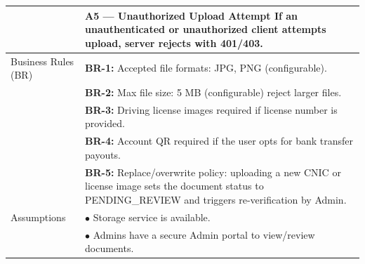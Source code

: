 \begin{longtable}{|>{\raggedright\arraybackslash}p{4cm}|>{\raggedright\arraybackslash}p{11cm}|}
& \textbf{A5 — Unauthorized Upload Attempt} \newline If an unauthenticated or unauthorized client attempts upload, server rejects with 401/403. \\
\hline
Business Rules (BR) & \textbf{BR-1:} Accepted file formats: JPG, PNG (configurable). \\
& \textbf{BR-2:} Max file size: 5 MB (configurable) reject larger files. \\
& \textbf{BR-3:} Driving license images required if license number is provided. \\
& \textbf{BR-4:} Account QR required if the user opts for bank transfer payouts. \\
& \textbf{BR-5:} Replace/overwrite policy: uploading a new CNIC or license image sets the document status to PENDING\_REVIEW and triggers re-verification by Admin. \\
\hline
Assumptions & $\bullet$ Storage service is available. \\
& $\bullet$ Admins have a secure Admin portal to view/review documents. \\
\end{longtable}

